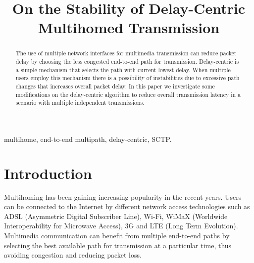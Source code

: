 \documentclass{sbrt2015}
\begin{document}
  \IEEEoverridecommandlockouts

  \title{On the Stability of Delay-Centric Multihomed Transmission}
  \author
  {
  }
  \maketitle
  
  

  \begin{abstract}
    The use of multiple network interfaces for multimedia transmission can reduce packet delay by choosing the less congested end-to-end path for transmission. Delay-centric is a simple mechanism that selects the path with current lowest delay. When multiple users employ this mechanism there is a possibility of instabilities due to excessive path changes that increases overall packet delay. In this paper we investigate some modifications on the delay-centric algorithm to reduce overall transmission latency in a scenario with multiple independent transmissions.
  \end{abstract}

  \begin{keywords}
    multihome, end-to-end multipath, delay-centric, SCTP.
  \end{keywords}


  \section{Introduction}

  Multihoming has been gaining increasing popularity in the recent years. Users can be connected to the Internet by different network access technologies such as ADSL (Asymmetric Digital Subscriber Line), Wi-Fi, WiMaX (Worldwide Interoperability for Microwave Access), 3G and LTE (Long Term Evolution). Multimedia communication can benefit from multiple end-to-end paths by selecting the best available path for transmission at a particular time, thus avoiding congestion and reducing packet loss.
\end{document}

